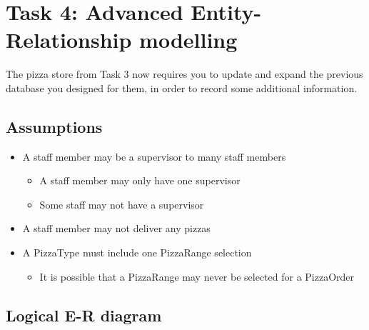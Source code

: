 \newpage
\section{Task 4: Advanced Entity-Relationship modelling}

The pizza store from Task 3 now requires you to update and expand the previous database you designed for them, in order to record some additional information.

\subsection{Assumptions}

\begin{itemize}
\item A staff member may be a supervisor to many staff members
	\begin{itemize}
	\item A staff member may only have one supervisor
	\item Some staff may not have a supervisor
	\end{itemize}
\item A staff member may not deliver any pizzas
\item A PizzaType must include one PizzaRange selection
	\begin{itemize}
	\item It is possible that a PizzaRange may never be selected for a PizzaOrder
	\end{itemize}
\end{itemize}

\subsection{Logical E-R diagram}

